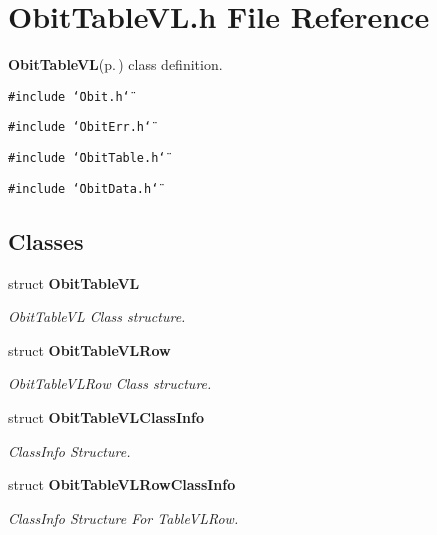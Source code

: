 \section{Obit\-Table\-VL.h File Reference}
\label{ObitTableVL_8h}
{\bf Obit\-Table\-VL}{\rm (p.\,\pageref{structObitTableVL})} class definition. 

{\tt \#include \char`\"{}Obit.h\char`\"{}}\par
{\tt \#include \char`\"{}Obit\-Err.h\char`\"{}}\par
{\tt \#include \char`\"{}Obit\-Table.h\char`\"{}}\par
{\tt \#include \char`\"{}Obit\-Data.h\char`\"{}}\par
\subsection*{Classes}
\begin{CompactItemize}
\item 
struct {\bf Obit\-Table\-VL}
\begin{CompactList}\small\item\em Obit\-Table\-VL Class structure. \item\end{CompactList}\item 
struct {\bf Obit\-Table\-VLRow}
\begin{CompactList}\small\item\em Obit\-Table\-VLRow Class structure. \item\end{CompactList}\item 
struct {\bf Obit\-Table\-VLClass\-Info}
\begin{CompactList}\small\item\em Class\-Info Structure. \item\end{CompactList}\item 
struct {\bf Obit\-Table\-VLRow\-Class\-Info}
\begin{CompactList}\small\item\em Class\-Info Structure For Table\-VLRow. \item\end{CompactList}\end{CompactItemize}
